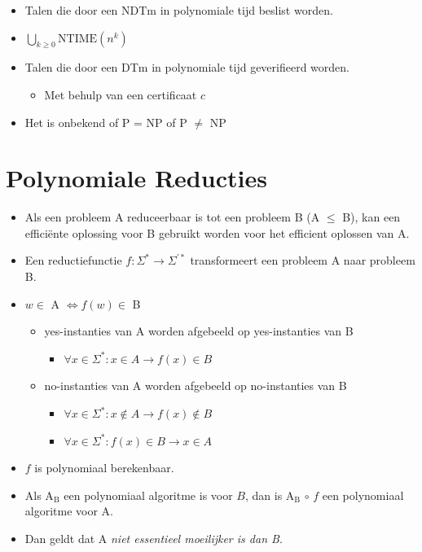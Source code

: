 \documentclass[]{article}
\begin{document}
\begin{itemize}
\item Talen die door een NDTm in polynomiale tijd beslist worden.
\item $\bigcup_{k\geq 0} \text{NTIME}(n^k)$
\item Talen die door een DTm in polynomiale tijd geverifieerd worden.
\begin{itemize}
\item Met behulp van een certificaat $c$
\end{itemize}
\item Het is onbekend of P = NP of P $\not=$ NP
\end{itemize}

\section*{Polynomiale Reducties}

\begin{itemize}
\item Als een probleem A reduceerbaar is tot een probleem B (A $\leq$ B), kan een effici\"ente oplossing voor B gebruikt worden voor het efficient oplossen van A.
\item Een reductiefunctie $f : \Sigma^* \rightarrow \Sigma^{'*}$ transformeert een probleem A naar probleem B.
\item $w \in$ A $\Leftrightarrow f(w) \in$ B
\begin{itemize}
\item yes-instanties van A worden afgebeeld op yes-instanties van B
\begin{itemize}
\item $\forall x \in \Sigma^* : x \in A \rightarrow f(x) \in B$
\end{itemize}
\item no-instanties van A worden afgebeeld op no-instanties van B
\begin{itemize}
\item $\forall x \in \Sigma^* : x \not\in A \rightarrow f(x) \not\in B$
\item $\forall x \in \Sigma^* : f(x) \in B \rightarrow x \in A$
\end{itemize}
\end{itemize}
\item $f$ is polynomiaal berekenbaar.
\item Als A$_\text{B}$ een polynomiaal algoritme is voor $B$, dan is A$_\text{B}$ $\circ$ $f$ een polynomiaal algoritme voor A.
\item Dan geldt dat A \textit{niet essentieel moeilijker is dan B}.
\end{itemize}
\end{document}
